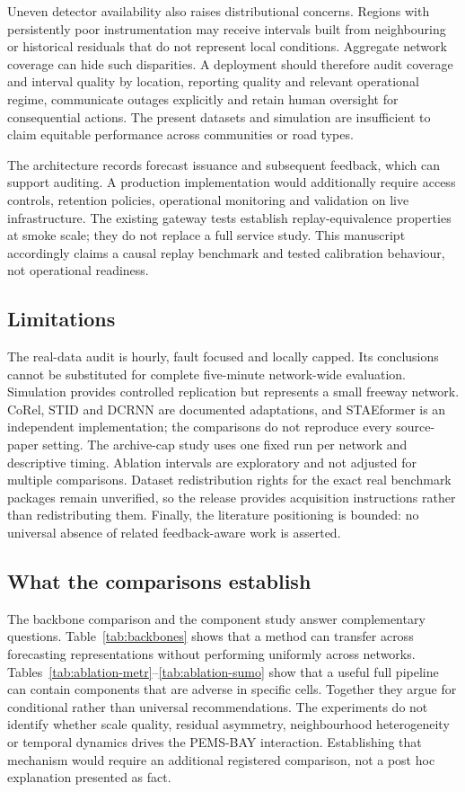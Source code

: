 Uneven detector availability also raises distributional concerns. Regions with persistently poor instrumentation may receive intervals built from neighbouring or historical residuals that do not represent local conditions. Aggregate network coverage can hide such disparities. A deployment should therefore audit coverage and interval quality by location, reporting quality and relevant operational regime, communicate outages explicitly and retain human oversight for consequential actions. The present datasets and simulation are insufficient to claim equitable performance across communities or road types.

The architecture records forecast issuance and subsequent feedback, which can support auditing. A production implementation would additionally require access controls, retention policies, operational monitoring and validation on live infrastructure. The existing gateway tests establish replay-equivalence properties at smoke scale; they do not replace a full service study. This manuscript accordingly claims a causal replay benchmark and tested calibration behaviour, not operational readiness.

\subsection{Limitations}
The real-data audit is hourly, fault focused and locally capped. Its conclusions cannot be substituted for complete five-minute network-wide evaluation. Simulation provides controlled replication but represents a small freeway network. CoRel, STID and DCRNN are documented adaptations, and STAEformer is an independent implementation; the comparisons do not reproduce every source-paper setting. The archive-cap study uses one fixed run per network and descriptive timing. Ablation intervals are exploratory and not adjusted for multiple comparisons. Dataset redistribution rights for the exact real benchmark packages remain unverified, so the release provides acquisition instructions rather than redistributing them. Finally, the literature positioning is bounded: no universal absence of related feedback-aware work is asserted.


\subsection{What the comparisons establish}
The backbone comparison and the component study answer complementary questions. Table~\ref{tab:backbones} shows that a method can transfer across forecasting representations without performing uniformly across networks. Tables~\ref{tab:ablation-metr}--\ref{tab:ablation-sumo} show that a useful full pipeline can contain components that are adverse in specific cells. Together they argue for conditional rather than universal recommendations. The experiments do not identify whether scale quality, residual asymmetry, neighbourhood heterogeneity or temporal dynamics drives the PEMS-BAY interaction. Establishing that mechanism would require an additional registered comparison, not a post hoc explanation presented as fact.

